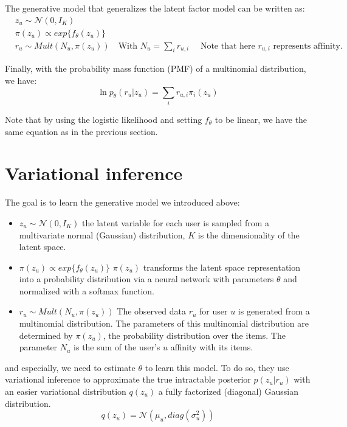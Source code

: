 The generative model that generalizes the latent factor model can be written as:
\begin{align*}
    &z_u \sim \mathcal{N}(0, I_K) \\
    &\pi(z_u) \propto exp\{f_{\theta}(z_u)\} \\
    &r_u \sim Mult(N_u, \pi(z_u)) \quad \text{With } N_u = \sum_{i} r_{u,i} \quad \text{ Note that here } r_{u,i} \text{ represents affinity.}
\end{align*}

Finally, with the probability mass function (PMF) of a multinomial distribution, we have:
\[
\ln p_{\theta}(r_u | z_u) = \sum_{i} r_{u,i} \pi_i(z_u)
\]

Note that by using the logistic likelihood and setting $f_{\theta}$ to be linear, we have the same equation as in the previous section.

\section{Variational inference}

The goal is to learn the generative model we introduced above:

\begin{itemize}
    \item $z_u \sim \mathcal{N}(0, I_K)$ the latent variable for each user is sampled from a multivariate normal (Gaussian) distribution, $K$ is the dimensionality of the latent space.

    \item $\pi(z_u) \propto exp\{f_{\theta}(z_u)\}$ $\pi(z_u)$ transforms the latent space representation into a probability distribution via a neural network with parameters $\theta$ and normalized with a softmax function.

    \item $r_u \sim Mult(N_u, \pi(z_u))$ The observed data $r_u$ for user $u$ is generated from a multinomial distribution. The parameters of this multinomial distribution are determined by $\pi(z_u)$, the probability distribution over the items. The parameter $N_u$ is the sum of the user's $u$ affinity with its items.
\end{itemize}

and especially, we need to estimate $\theta$ to learn this model. To do so, they use variational inference to approximate the true intractable posterior $p(z_u | r_u)$ with an easier variational distribution $q(z_u)$ a fully factorized (diagonal) Gaussian distribution.
\[
q(z_u) = \mathcal{N}\left(\mu_u, diag(\sigma_u^2)\right)
\]

